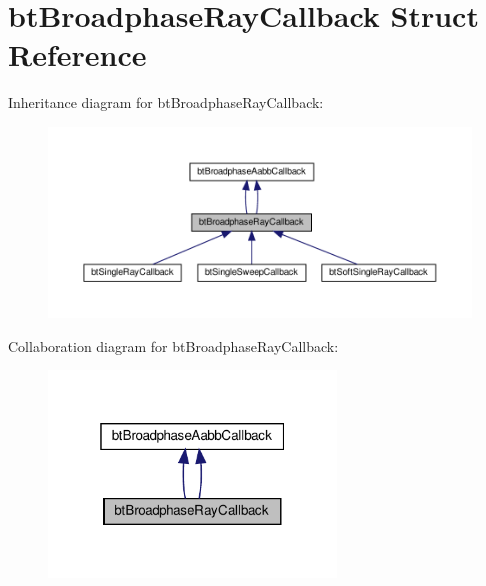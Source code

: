 \hypertarget{structbtBroadphaseRayCallback}{}\section{bt\+Broadphase\+Ray\+Callback Struct Reference}
\label{structbtBroadphaseRayCallback}


Inheritance diagram for bt\+Broadphase\+Ray\+Callback\+:
\nopagebreak
\begin{figure}[H]
\begin{center}
\leavevmode
\includegraphics[width=350pt]{structbtBroadphaseRayCallback__inherit__graph}
\end{center}
\end{figure}


Collaboration diagram for bt\+Broadphase\+Ray\+Callback\+:
\nopagebreak
\begin{figure}[H]
\begin{center}
\leavevmode
\includegraphics[width=217pt]{structbtBroadphaseRayCallback__coll__graph}
\end{center}
\end{figure}

